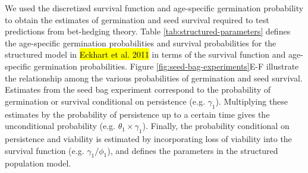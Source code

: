 \documentclass[12pt, oneside, titlepage]{article}   	%
\begin{document}
We used the discretized survival function and age-specific germination probability to obtain the estimates of germination and seed survival required to test predictions from bet-hedging theory. Table \ref{tab:structured-parameters} defines the age-specific germination probabilities and survival probabilities for the structured model in \hl{Eckhart et al. 2011} in terms of the survival function and age-specific germination probabilities. Figure \ref{fig:seed-bag-experiments}E-F illustrate the relationship among the various probabilities of germination and seed survival. Estimates from the seed bag experiment correspond to the probability of germination or survival conditional on persistence (e.g. $\gamma_1$). Multiplying these estimates by the probability of persistence up to a certain time gives the unconditional probability (e.g. $\theta_1 \times \gamma_1$). Finally, the probability conditional on persistence and viability is estimated by incorporating loss of viability into the survival function (e.g. $\gamma_1 / \phi_1$), and defines the parameters in the structured population model.
\end{document}
